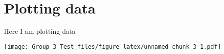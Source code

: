 \documentclass[
]{article}
\newenvironment{Shaded}{\begin{snugshade}}{\end{snugshade}}
\newcommand{\AttributeTok}[1]{\textcolor[rgb]{0.77,0.63,0.00}{#1}}
\newcommand{\DecValTok}[1]{\textcolor[rgb]{0.00,0.00,0.81}{#1}}
\newcommand{\FunctionTok}[1]{\textcolor[rgb]{0.00,0.00,0.00}{#1}}
\newcommand{\NormalTok}[1]{#1}
\newcommand{\SpecialCharTok}[1]{\textcolor[rgb]{0.00,0.00,0.00}{#1}}
\newcommand{\StringTok}[1]{\textcolor[rgb]{0.31,0.60,0.02}{#1}}
\begin{document}
\hypertarget{plotting-data}{%
\section{Plotting data}\label{plotting-data}}

Here I am plotting data

\begin{Shaded}
\end{Shaded}

\texttt{[image: Group-3-Test\_files/figure-latex/unnamed-chunk-3-1.pdf]}
\end{document}
